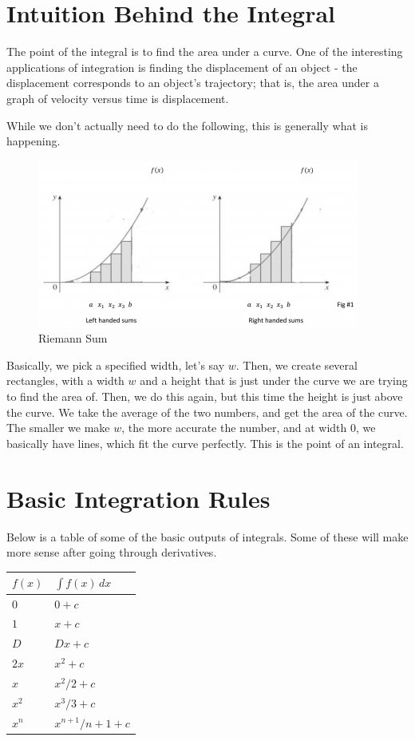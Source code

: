 \chapter{Intuition Behind the Integral}
The point of the integral is to find the area under a curve. 
One of the interesting applications of integration is finding the displacement of an object - the displacement corresponds to an object's trajectory; that is, the area under a graph of velocity versus time is displacement.

While we don't actually need to do the following, this is generally what is happening. 

\begin{centering}
\begin{figure}[H]
\caption{Riemann Sum}
\includegraphics[scale=0.8]{../rieman.jpg}
\end{figure}
\end{centering}

Basically, we pick a specified width, let's say $w$. 
Then, we create several rectangles, with a width $w$ and a height that is just under the curve we are trying to find the area of. 
Then, we do this again, but this time the height is just above the curve. 
We take the average of the two numbers, and get the area of the curve. 
The smaller we make $w$, the more accurate the number, and at width $0$, we basically have lines, which fit the curve perfectly. 
This is the point of an integral.
\chapter{Basic Integration Rules}
Below is a table of some of the basic outputs of integrals. Some of these will make more sense after going through derivatives.

\begin{tabular}{l|l}
    $f(x)$ & $\int f(x) \, dx$\\
    \hline
     $0$ & $0+c$ \\
     $1$ & $x+c$ \\
     $D$ & $Dx+c$ \\
     $2x$ & $x^2 + c$ \\
     $x$ & $x^2/2 + c$ \\
     $x^2$ & $x^3/3 + c$ \\
     $x^n$ & $x^{n+1}/n+1 + c$
\end{tabular}

